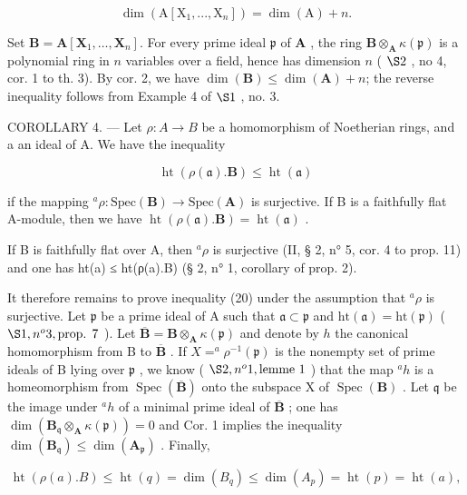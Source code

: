 \[
\dim (\mathrm{A} [ \mathrm{X} _ {1},..., \mathrm{X} _ {n} ]) = \dim (\mathrm{A}) + n.
\]

Set \(\mathbf{B} = \mathbf{A}[\mathbf{X}_1, \ldots, \mathbf{X}_n]\). For every prime ideal \(\mathfrak{p}\) of \(\mathbf{A}\) , the ring \(\mathbf{B} \otimes_{\mathbf{A}} \kappa(\mathfrak{p})\) is a polynomial ring in \(n\) variables over a field, hence has dimension \(n\) ( \(\S 2\) , no 4, cor. 1 to th. 3). By cor. 2, we have \(\dim(\mathbf{B}) \leqslant \dim(\mathbf{A}) + n\); the reverse inequality follows from Example 4 of \(\S 1\) , no. 3.

COROLLARY 4. --- Let \(\rho: A \to B\) be a homomorphism of Noetherian rings, and a an ideal of A. We have the inequality

\[
\operatorname{ht} (\rho (\mathfrak {a}). \mathbf {B}) \leqslant \operatorname{ht} (\mathfrak {a})\tag{20}
\]

if the mapping \(^a\rho : \text{Spec}(\mathbf{B}) \to \text{Spec}(\mathbf{A})\) is surjective. If B is a faithfully flat A-module, then we have \(\operatorname{ht}(\rho(\mathfrak{a}).\mathbf{B}) = \operatorname{ht}(\mathfrak{a})\) .

If B is faithfully flat over A, then \(^{a}\rho\) is surjective (II, § 2, n° 5, cor. 4 to prop. 11) and one has ht(a) ≤ ht(ρ(a).B) (§ 2, n° 1, corollary of prop. 2).

It therefore remains to prove inequality (20) under the assumption that \(^a\rho\) is surjective. Let \(\mathfrak{p}\) be a prime ideal of A such that \(\mathfrak{a} \subset \mathfrak{p}\) and \(\mathrm{ht}(\mathfrak{a}) = \mathrm{ht}(\mathfrak{p})\) ( \(\S 1, n^o 3, \text{prop. } 7\) ). Let \(\overline{\mathbf{B}} = \mathbf{B} \otimes_{\mathbf{A}} \kappa(\mathfrak{p})\) and denote by \(h\) the canonical homomorphism from B to \(\overline{\mathbf{B}}\) . If \(X = ^a\rho^{-1}(\mathfrak{p})\) is the nonempty set of prime ideals of B lying over \(\mathfrak{p}\) , we know ( \(\S 2, n^o 1, \text{lemme 1}\) ) that the map \(^ah\) is a homeomorphism from \(\operatorname{Spec}(\overline{\mathbf{B}})\) onto the subspace X of \(\operatorname{Spec}(\mathbf{B})\) . Let \(\mathfrak{q}\) be the image under \(^ah\) of a minimal prime ideal of \(\overline{\mathbf{B}}\) ; one has \(\dim(\mathbf{B}_{\mathfrak{q}} \otimes_{\mathbf{A}} \kappa(\mathfrak{p})) = 0\) and Cor. 1 implies the inequality \(\dim(\mathbf{B}_{\mathfrak{q}}) \leqslant \dim(\mathbf{A}_{\mathfrak{p}})\) . Finally,

\[
\operatorname{ht} (\rho (a). B) \leqslant \operatorname{ht} (q) = \dim (B _ {q}) \leqslant \dim (A _ {p}) = \operatorname{ht} (p) = \operatorname{ht} (a),
\]

